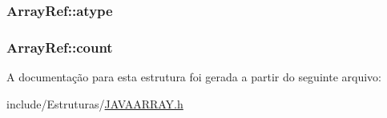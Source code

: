 \subsubsection[{atype}]{ Array\+Ref\+::atype}\label{struct_array_ref_a0517c4d135daa6329b39ea01e5c498d2}
\hypertarget{struct_array_ref_abaaae2def8584a14b087e76d4308aec7}{}
\subsubsection[{count}]{ Array\+Ref\+::count}\label{struct_array_ref_abaaae2def8584a14b087e76d4308aec7}


A documentação para esta estrutura foi gerada a partir do seguinte arquivo\+:\begin{DoxyCompactItemize}
\item 
include/\+Estruturas/\hyperlink{_j_a_v_a_a_r_r_a_y_8h}{J\+A\+V\+A\+A\+R\+R\+A\+Y.\+h}\end{DoxyCompactItemize}
